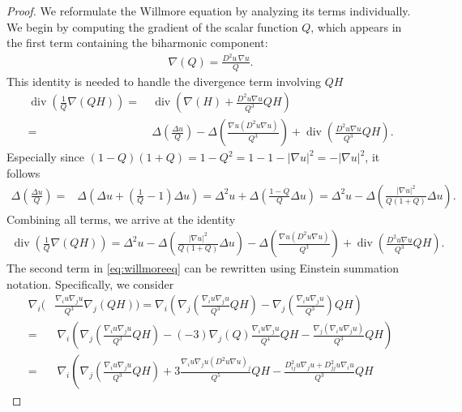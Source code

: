 \documentclass[10pt,a4paper]{amsart}
\renewcommand{\div}{\operatorname{div}}
\begin{document}
\begin{proof}
We reformulate the Willmore equation by analyzing its terms individually. We begin by computing the gradient of the scalar function $Q$, which appears in the first term containing the biharmonic component:
\begin{align*}
    \nabla (Q)= \frac{D^2u \, \nabla u}{Q}.
\end{align*}
This identity is needed to handle the divergence term involving $QH$
\begin{align*}
    \div\left( \frac{1}{Q} \nabla (Q H) \right) 
    =&\  \div\left(  \nabla ( H) + \frac{D^2u \nabla u}{Q^3} QH \right) \\
    = &\ \Delta \left( \frac{\Delta u }{Q} \right) - \Delta \left( \frac{\nabla u (D^2 u \nabla u)}{Q^3} \right)  +\div\left( \frac{D^2u \nabla u}{Q^3} QH  \right).
\end{align*}
Especially since $(1-Q)(1+Q)=1-Q^2 = 1-1-|\nabla u|^2= -|\nabla u|^2$, it follows
\begin{align*}
\Delta \left( \frac{\Delta u }{Q} \right)   =& \Delta \left( \Delta u+\left(\frac{1}{Q}-1\right)\Delta u \right) = 
\Delta ^2 u +\Delta \left(\frac{1-Q}{Q}\Delta u \right) =
\Delta ^2 u - \Delta \left( \frac{|\nabla u|^2}{Q(1+Q)}\Delta u  \right).
\end{align*}
Combining all terms, we arrive at the identity
\begin{align*}
        \div\left( \frac{1}{Q} \nabla (Q H) \right) 
    = \Delta ^2 u - \Delta \left( \frac{|\nabla u|^2}{Q(1+Q)}\Delta u  \right) - \Delta \left( \frac{\nabla u (D^2 u \nabla u)}{Q^3} \right)  +\div\left( \frac{D^2u \nabla u}{Q^3} QH  \right).
\end{align*}
The second term in \eqref{eq:willmoreeq} can be rewritten using Einstein summation notation. Specifically, we consider
\begin{align*}
 \nabla_i\Bigg( & \frac{\nabla_i u \nabla _j u}{Q^3}  \nabla_j (Q H) \Bigg) 
    = \nabla_i\left( \nabla_j \left( \frac{\nabla_i u \nabla _j u}{Q^3}Q H \right)
     -\nabla_j\left( \frac{\nabla_i u \nabla _j u}{Q^3} \right)  Q H 
     \right)  \\
     =&\  \nabla_i\left( \nabla_j \left( \frac{\nabla_i u \nabla _j u}{Q^3}Q H \right)
     -(-3)\nabla_j (Q) \frac{\nabla_i u \nabla _j u}{Q^4}   Q H 
     - \frac{\nabla_j(\nabla_i u \nabla _j u)}{Q^3}   Q H 
     \right)  \\
     =&\  \nabla_i\left( \nabla_j \left( \frac{\nabla_i u \nabla _j u}{Q^3}Q H \right)
     + 3  \frac{\nabla_i u \nabla _j u (D^2u \nabla u)_j }{Q^5}Q H  -   \frac{D^2_{ij} u \nabla _j u +D^2_{jj} u \nabla _i u }{Q^3}Q H 

\end{align*}
\end{proof}
\end{document}
